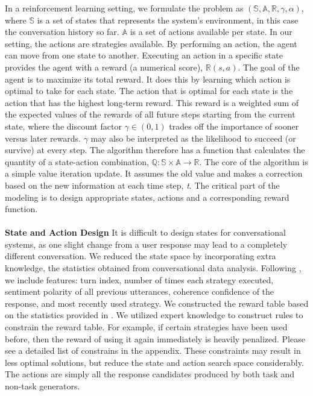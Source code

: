 \documentclass[11pt]{article}
\newcommand{\dk}[1]{{\color{red} #1}}
\begin{document}
In a reinforcement learning setting, we formulate the problem as $(\mathbb{S},\mathbb{A},\mathbb{R},\gamma,\alpha)$, where $\mathbb{S}$ is a set of states that represents the system's environment, in this case the conversation history so far. $\mathbb{A}$ is a set of actions available per state. In our setting, the actions are strategies available. By performing an action, the agent can move from one state to another. Executing an action in a specific state provides the agent with a reward (a numerical score), $\mathbb{R}(s,a)$. The goal of the agent is to maximize its total reward. It does this by learning which action is optimal to take for each state. The action that is optimal for each state is the action that has the highest long-term reward. This reward is a weighted sum of the expected values of the rewards of all future steps starting from the current state, where the discount factor $\gamma \in (0, 1)$ trades off the importance of sooner versus later rewards. $\gamma$  may also be interpreted as the likelihood to succeed (or survive) at every step. The algorithm therefore has a function that calculates the quantity of a state-action combination, $\mathbb{Q}: \mathbb{S} \times \mathbb{A} \rightarrow \mathbb{R}$. The core of the algorithm is a simple value iteration update. It assumes the old value and makes a correction based on the new information at each time step, \textit{t}. %
The critical part of the modeling is to design appropriate states, actions and a corresponding reward function.\\
\\
\noindent\textbf{State and Action Design}
It is difficult to design states for conversational systems, as one slight change from a user response may lead to a completely different conversation. We reduced the state space by incorporating extra knowledge, the statistics obtained from conversational data analysis. Following \cite{yu2016sigdial}, we include features: turn index, number of times each strategy executed, sentiment polarity of all previous utterances, coherence confidence of the response, and most recently used strategy. We constructed the reward table based on the statistics provided in \cite{yu2016sigdial} %
. We utilized expert knowledge to construct rules to constrain the reward table. For example, if certain strategies have been used before, then the reward of using it again immediately is heavily penalized. Please see a detailed list of constrains in the appendix. These constraints may result in less optimal solutions, but reduce the state and action search space considerably. The actions are simply all the response candidates produced by both task and non-task generators.\\
\end{document}
